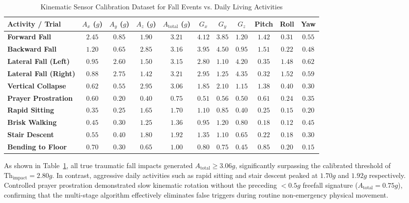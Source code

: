 \begin{table}[htbp]
    \centering
    \caption{Kinematic Sensor Calibration Dataset for Fall Events vs. Daily Living Activities}
    \label{tab:fall_calibration}
    \begin{tabularx}{\textwidth}{l c c c c c c c c c c}
        \toprule
        \textbf{Activity / Trial} & \textbf{$A_x$ ($g$)} & \textbf{$A_y$ ($g$)} & \textbf{$A_z$ ($g$)} & \textbf{$A_{\text{total}}$ ($g$)} & \textbf{$G_x$} & \textbf{$G_y$} & \textbf{$G_z$} & \textbf{Pitch} & \textbf{Roll} & \textbf{Yaw} \\
        \midrule
        \textbf{Forward Fall} & $2.45$ & $0.85$ & $1.90$ & $\mathbf{3.21}$ & $4.12$ & $3.85$ & $1.20$ & $1.42$ & $0.31$ & $0.55$ \\
        \textbf{Backward Fall} & $1.20$ & $0.65$ & $2.85$ & $\mathbf{3.16}$ & $3.95$ & $4.50$ & $0.95$ & $1.51$ & $0.22$ & $0.48$ \\
        \textbf{Lateral Fall (Left)} & $0.95$ & $2.60$ & $1.50$ & $\mathbf{3.15}$ & $2.80$ & $1.10$ & $4.20$ & $0.35$ & $1.48$ & $0.62$ \\
        \textbf{Lateral Fall (Right)} & $0.88$ & $2.75$ & $1.42$ & $\mathbf{3.21}$ & $2.95$ & $1.25$ & $4.35$ & $0.32$ & $1.52$ & $0.59$ \\
        \textbf{Vertical Collapse} & $0.62$ & $0.55$ & $2.95$ & $\mathbf{3.06}$ & $1.85$ & $2.10$ & $1.15$ & $1.38$ & $0.40$ & $0.30$ \\
        \midrule
        \textbf{Prayer Prostration} & $0.60$ & $0.20$ & $0.40$ & $\mathbf{0.75}$ & $0.51$ & $0.56$ & $0.50$ & $0.61$ & $0.24$ & $0.35$ \\
        \textbf{Rapid Sitting} & $0.35$ & $0.25$ & $1.65$ & $\mathbf{1.70}$ & $1.10$ & $0.85$ & $0.40$ & $0.25$ & $0.15$ & $0.20$ \\
        \textbf{Brisk Walking} & $0.45$ & $0.30$ & $1.25$ & $\mathbf{1.36}$ & $0.95$ & $1.20$ & $0.80$ & $0.18$ & $0.12$ & $0.45$ \\
        \textbf{Stair Descent} & $0.55$ & $0.40$ & $1.80$ & $\mathbf{1.92}$ & $1.35$ & $1.10$ & $0.65$ & $0.22$ & $0.18$ & $0.30$ \\
        \textbf{Bending to Floor} & $0.70$ & $0.30$ & $0.65$ & $\mathbf{1.00}$ & $0.80$ & $0.75$ & $0.45$ & $0.85$ & $0.20$ & $0.15$ \\
        \bottomrule
    \end{tabularx}
\end{table}

As shown in Table~\ref{tab:fall_calibration}, all true traumatic fall impacts generated $A_{\text{total}} \ge 3.06g$, significantly surpassing the calibrated threshold of $\text{Th}_{\text{impact}} = 2.80g$. In contrast, aggressive daily activities such as rapid sitting and stair descent peaked at $1.70g$ and $1.92g$ respectively. Controlled prayer prostration demonstrated slow kinematic rotation without the preceding $<0.5g$ freefall signature ($A_{\text{total}} = 0.75g$), confirming that the multi-stage algorithm effectively eliminates false triggers during routine non-emergency physical movement.

